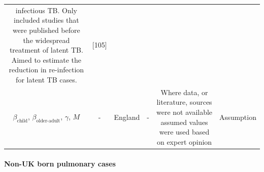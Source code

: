 \documentclass[11pt,twoside]{bristolthesis}
\begin{document}
\begin{longtable}[]{@{}cccccc@{}}
\begin{minipage}[t]{0.27\columnwidth}
  infectious TB. Only included studies
  that were published before the
  widespread treatment of latent TB. Aimed
  to estimate the reduction in
  re-infection for latent TB cases.\strut
  \end{minipage} & \begin{minipage}[t]{0.11\columnwidth}\centering
  {[}105{]}\strut
  \end{minipage}\tabularnewline
  \begin{minipage}[t]{0.21\columnwidth}\centering
  \(\beta_{\text{child}}\),
  \(\beta_{\text{older-adult}}\),
  \(\gamma\),
  \(M\)\strut
  \end{minipage} & \begin{minipage}[t]{0.10\columnwidth}\centering
  -\strut
  \end{minipage} & \begin{minipage}[t]{0.07\columnwidth}\centering
  England\strut
  \end{minipage} & \begin{minipage}[t]{0.07\columnwidth}\centering
  -\strut
  \end{minipage} & \begin{minipage}[t]{0.27\columnwidth}\centering
  Where data, or literature, sources were
  not available assumed values were used
  based on expert opinion\strut
  \end{minipage} & \begin{minipage}[t]{0.11\columnwidth}\centering
  Assumption\strut
  \end{minipage}\tabularnewline
  \bottomrule
  \end{longtable}
  \hypertarget{non-uk-born-pulmonary-cases}{%
  \paragraph{Non-UK born pulmonary cases}\label{non-uk-born-pulmonary-cases}}
  
\end{document}
